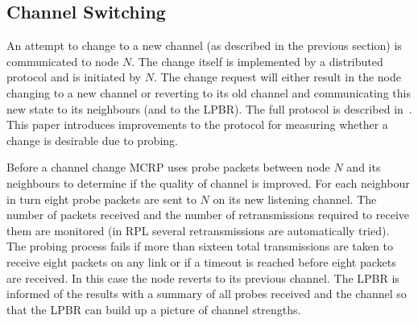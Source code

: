 \subsection{Channel Switching}
\label{sec:switching}

An attempt to change to a new channel (as described in the previous section) is communicated to node $N$.  The change itself is implemented by a distributed protocol and is initiated  by $N$. The change request will either result in the node changing to a new channel or reverting to its old channel and communicating this new state to its neighbours (and to the LPBR).  The full protocol is described in~\cite{mcrp}.  This paper introduces improvements to the protocol for measuring whether a change is desirable due to probing.



Before a channel change MCRP uses probe packets between node $N$ and its neighbours to determine if the quality of channel is improved.  For each neighbour in turn eight probe packets are sent to $N$ on its new listening channel.  The number of packets received and the number of retransmissions required to receive them are monitored (in RPL several retransmissions are automatically tried).  The probing process fails if more than sixteen total transmissions are taken to receive eight packets on any link or if a timeout is reached before eight packets are received. In this case the node reverts to its previous channel.  The LPBR is informed of the results with a summary of all probes received and the channel so that the LPBR can build up a picture of channel strengths.


